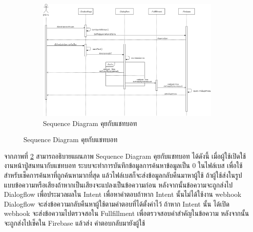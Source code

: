 	\begin{figure}
	\begin{figure}[H]
		\centering
		\includegraphics[width=0.8\columnwidth]
		{Figures/3/Sequence/chatbot}
		\caption{Sequence Diagram คุยกับแชทบอท}
		\label{Fig:Sequence-chatbot}
	\end{figure}
\end{figure}
	\newpage
	จากภาพที่ \ref{Fig:Sequence-chatbot} สามารถอธิบายแผนภาพ Sequence Diagram คุยกับแชทบอท ได้ดังนี้ 
	เมื่อผู้ใช้เปิดใช้งานหน้าปู่สนทนากับแชทบอท ระบบจะทำการบันทึกข้อมูลการค้นหาข้อมูลเป็น 0 ในไฟล์เบส เพื่อใช้สำหรับเช็คการค้นหาที่ถูกค้นหามากที่สุด
	แล้วไฟล์เบสก็จะส่งข้อมูลกลับคืนมาหาผู้ใช้ ถ้าผู้ใช้ส่งในรูปแบบข้อความหรือเสียงถ้าหากเป็นเสียงจะแปลงเป็นข้อความก่อน หลังจากนั้นข้อความจะถูกส่งไป Dialogflow 
	เพื่อประมวลผลใน Intent เพื่อหาคำตอบถ้าหาก Intent นั้นไม่ได้ใช้งาน webhook Dialogflow จะส่งข้อความกลับคืนหาผู้ใช้ตามคำตอบที่ได้ตั้งค่าไว้ ถ้าหาก Intent นั้น
	ได้เปิด webhook จะส่งข้อความไปตรวจสอใน Fullfillment เพื่อตรวจสอบคำสำคัญในข้อความ หลังจากนั้นจะถูกส่งไปเช็คใน Firebase แล้วส่ง
	คำตอบกลับมายังผู้ใช้
	\newpage	


